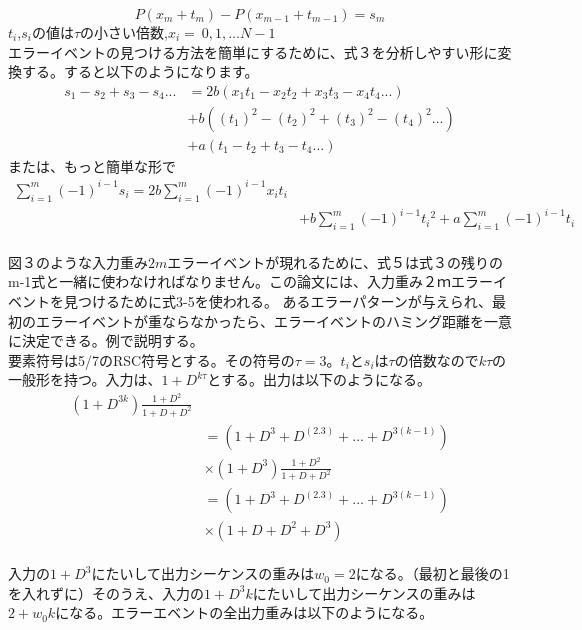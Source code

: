 \documentclass[20 pts]{article}
\begin{document}
\begin{equation}\tag{3.m}
P(x_m+t_m)-P(x_{m-1}+t_{m-1})=s_m
\end{equation}
$t_i$,$s_i$の値は$\tau$の小さい倍数,$x_i=\ {0,1,…N-1\ }$\\
エラーイベントの見つける方法を簡単にするために、式３を分析しやすい形に変換する。すると以下のようになります。
\begin{equation}\tag{4}
\begin{split}
s_1-s_2+s_3-s_4...&=2b(x_1t_1-x_2t_2+x_3t_3-x_4t_4...)\\
&+b((t_1)^2-(t_2)^2+(t_3)^2-(t_4)^2...)\\
&+a(t_1-t_2+t_3-t_4...)
\end{split}
\end{equation}
または、もっと簡単な形で
\begin{equation}\tag{5}
\begin{split}
\sum_{i=1}^m (-1)^{i-1}s_i=2b\sum_{i=1}^m (-1)^{i-1}x_it_i\\
&+b\sum_{i=1}^m (-1)^{i-1} {t_i}^2+a\sum_{i=1}^m (-1)^{i-1}t_i
\end{split}
\end{equation}
\paragraph{}
図３のような入力重み$2m$エラーイベントが現れるために、式５は式３の残りのm-1式と一緒に使わなければなりません。この論文には、入力重み２ｍエラーイベントを見つけるために式3-5を使われる。
あるエラーパターンが与えられ、最初のエラーイベントが重ならなかったら、エラーイベントのハミング距離を一意に決定できる。例で説明する。\\
要素符号は5/7のRSC符号とする。その符号の$\tau=3$。$t_i$と$s_i$は$\tau$の倍数なので$k\tau$の一般形を持つ。入力は、$1+D^{k\tau}$とする。出力は以下のようになる。
\begin{equation}\tag{6}
\begin{split}
(1+D^{3k})\frac{1+D^2}{1+D+D^2}\\
&=(1+D^3+D^(2.3)+...+D^{3(k-1)})\\
&\times(1+D^{3})\frac{1+D^2}{1+D+D^2}\\
&=(1+D^3+D^(2.3)+...+D^{3(k-1)})\\
&\times(1+D+D^2+D^3)
\end{split}
\end{equation}
\paragraph{}
入力の$1+D^3$にたいして出力シーケンスの重みは$w_0=2$になる。（最初と最後の1を入れずに）そのうえ、入力の$1+D^3k$にたいして出力シーケンスの重みは$2+w_0k$になる。エラーエベントの全出力重みは以下のようになる。
\end{document}
